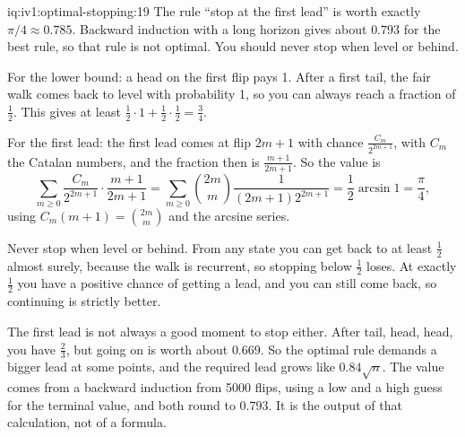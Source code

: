 \begin{solution}{iq:iv1:optimal-stopping:19}
The rule ``stop at the first lead'' is worth exactly $\pi/4 \approx 0.785$. Backward induction with a long horizon gives about $0.793$ for the best rule, so that rule is not optimal. You should never stop when level or behind.

For the lower bound: a head on the first flip pays 1. After a first tail, the fair walk comes back to level with probability 1, so you can always reach a fraction of $\tfrac12$. This gives at least $\tfrac12 \cdot 1 + \tfrac12 \cdot \tfrac12 = \tfrac34$.

For the first lead: the first lead comes at flip $2m + 1$ with chance $\frac{C_m}{2^{2m + 1}}$, with $C_m$ the Catalan numbers, and the fraction then is $\frac{m + 1}{2m + 1}$. So the value is
\[
\sum_{m \ge 0} \frac{C_m}{2^{2m + 1}} \cdot \frac{m + 1}{2m + 1} = \sum_{m \ge 0} \binom{2m}{m}\frac{1}{(2m + 1)2^{2m + 1}} = \frac12 \arcsin 1 = \frac{\pi}{4},
\]
using $C_m(m + 1) = \binom{2m}{m}$ and the arcsine series.

Never stop when level or behind. From any state you can get back to at least $\tfrac12$ almost surely, because the walk is recurrent, so stopping below $\tfrac12$ loses. At exactly $\tfrac12$ you have a positive chance of getting a lead, and you can still come back, so continuing is strictly better.

The first lead is not always a good moment to stop either. After tail, head, head, you have $\tfrac23$, but going on is worth about $0.669$. So the optimal rule demands a bigger lead at some points, and the required lead grows like $0.84\sqrt{n}$. The value comes from a backward induction from 5000 flips, using a low and a high guess for the terminal value, and both round to $0.793$. It is the output of that calculation, not of a formula.

\end{solution}

